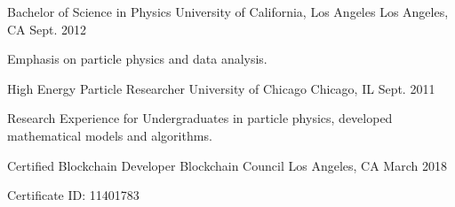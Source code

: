 


\begin{cventries}


\cventry
{Bachelor of Science in Physics} %
{University of California, Los Angeles} %
{Los Angeles, CA} %
{Sept. 2012} %
{ %
\begin{cvitems}
\item {Emphasis on particle physics and data analysis.}
\end{cvitems}
}

\cventry
{High Energy Particle Researcher} %
{University of Chicago} %
{Chicago, IL} %
{Sept. 2011} %
{ %
\begin{cvitems}
\item {Research Experience for Undergraduates in particle physics, developed mathematical
models and algorithms.}
\end{cvitems}
}

\cventry
{Certified Blockchain Developer} %
{Blockchain Council} %
{Los Angeles, CA}
{March 2018} %
{ %
\begin{cvitems}
\item {Certificate ID: 11401783}
\end{cvitems}
}


\end{cventries}